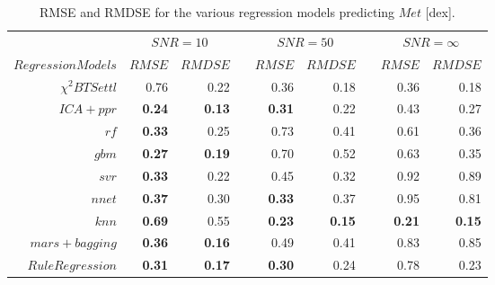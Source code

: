 %
%
\begin{table}\centering
\begin{tabular}{@{}rrrcrrcrr@{}}\toprule
& \multicolumn{2}{c}{$SNR = 10$} & \phantom{ab}& \multicolumn{2}{c}{$SNR = 50$} &
\phantom{ab} & \multicolumn{2}{c}{$SNR = \infty$}\\
\cmidrule{2-3} \cmidrule{5-6} \cmidrule{8-9}
$Regression Models$ & $RMSE$ & $RMDSE$ && $RMSE$ & $RMDSE$     && $RMSE$       & $RMDSE$ \\ \midrule
$\chi^2 BTSettl$    &  0.76    & 0.22   && 0.36      & 0.18     && 0.36          & 0.18 \\
$ ICA+ ppr$         & \bf{0.24} & \bf{0.13} && \bf{0.31}  & 0.22 && 0.43       & 0.27 \\
$rf $               & \bf{0.33} & 0.25    && 0.73   & 0.41      && 0.61       & 0.36 \\
$gbm $              & \bf{0.27} & \bf{0.19} && 0.70  & 0.52      && 0.63      & 0.35 \\
$ svr $             & \bf{0.33} & 0.22       && 0.45 & 0.32       && 0.92      & 0.89 \\
$ nnet $            & \bf{0.37} & 0.30      && \bf{0.33} & 0.37    && 0.95    & 0.81 \\
$ knn $             & \bf{0.69}  & 0.55     && \bf{0.23}   & \bf{0.15} && \bf{0.21} & \bf{0.15} \\ 
$ mars+ bagging $   & \bf{0.36}  & \bf{0.16} && 0.49     & 0.41      && 0.83    & 0.85 \\
$Rule Regression $  & \bf{0.31} & \bf{0.17} && \bf{0.30} & 0.24  && 0.78 &  0.23 \\

\bottomrule
\end{tabular}
\caption {RMSE and RMDSE for the various regression models predicting $Met$ [dex].} 
\label{tab:models_M_rmse} 
\end{table}

 


